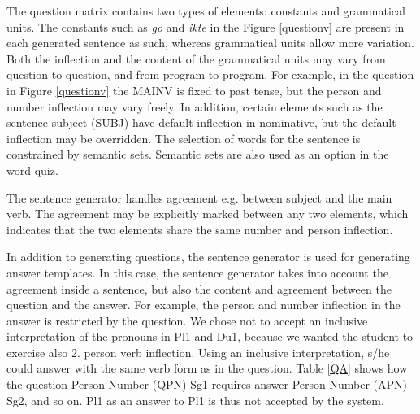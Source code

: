 \documentclass[11pt]{article}
\begin{document}
The question matrix contains two types of elements: constants and grammatical units. The constants such as \textit{go} and \textit{ikte} in the Figure \ref{questionv} are present in each generated sentence as such, whereas grammatical units allow more variation. Both the inflection and the content of the grammatical units may vary from question to question, and from program to program. For example, in the question in Figure \ref{questionv} the MAINV is fixed to past tense, but the person and number inflection may vary freely. In addition, certain elements such as the sentence subject (SUBJ) have default inflection in nominative, but the default inflection may be overridden. The selection of words for the sentence is constrained by semantic sets. Semantic sets are also used as an option in the word quiz. 
%


The sentence generator handles agreement e.g. between subject and the main verb. The agreement may be explicitly marked between any two elements, which indicates that the two elements share the same number and person inflection.

In addition to generating questions, the sentence generator is used for generating answer templates. In this case, the sentence generator takes into account the agreement inside a sentence, but also the content and agreement between the question and the answer. For example, the person and number inflection in the answer is restricted by the question. We chose not to accept an inclusive interpretation of the pronouns in Pl1 and Du1, because we wanted the student to exercise also 2. person verb inflection. Using an inclusive interpretation, s/he could answer with the same verb form as in the question. Table \ref{QA} shows how the question Person-Number (QPN) Sg1 requires answer Person-Number (APN) Sg2, and so on. Pl1 as an answer to Pl1 is thus not accepted by the system.\\
\end{document}
